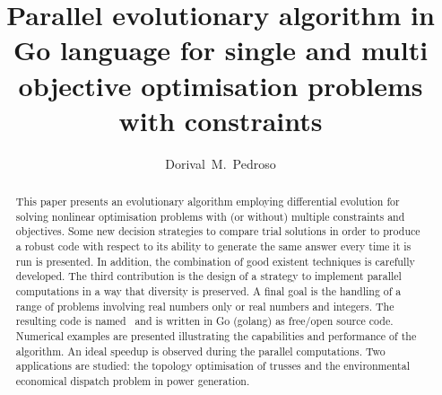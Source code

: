 \documentclass[final,5p,times,twocolumn]{elsarticle}
\begin{document}
\begin{frontmatter}




\title{Parallel evolutionary algorithm in Go language for single and multi objective optimisation
problems with constraints}


\author[uq]{Dorival~M.~Pedroso}

\address[uq]{School of Civil Engineering, The University of Queensland, St Lucia QLD 4072, Australia}



\begin{abstract}

This paper presents an evolutionary algorithm employing differential evolution for solving nonlinear
optimisation problems with (or without) multiple constraints and objectives. Some new decision
strategies to compare trial solutions in order to produce a robust code with respect to its ability
to generate the same answer every time it is run is presented. In addition, the combination of good
existent techniques is carefully developed. The third contribution is the design of a strategy to
implement parallel computations in a way that diversity is preserved. A final goal is the handling
of a range of problems involving real numbers only or real numbers and integers. The resulting code
is named \goga~and is written in Go (golang) as free/open source code. Numerical examples are
presented illustrating the capabilities and performance of the algorithm. An ideal speedup is
observed during the parallel computations. Two applications are studied: the topology optimisation
of trusses and the environmental economical dispatch problem in power generation.


\end{abstract}
\end{frontmatter}
\end{document}
